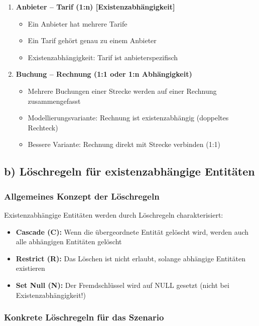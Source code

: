 \documentclass[12pt,a4paper]{article}
\begin{document}
\begin{enumerate}
    \item \textbf{Anbieter -- Tarif (1:n) [Existenzabhängigkeit]}
    \begin{itemize}
        \item Ein Anbieter hat mehrere Tarife
        \item Ein Tarif gehört genau zu einem Anbieter
        \item Existenzabhängigkeit: Tarif ist anbieterspezifisch
    \end{itemize}

    \item \textbf{Buchung -- Rechnung (1:1 oder 1:n Abhängigkeit)}
    \begin{itemize}
        \item Mehrere Buchungen einer Strecke werden auf einer Rechnung zusammengefasst
        \item Modellierungsvariante: Rechnung ist existenzabhängig (doppeltes Rechteck)
        \item Bessere Variante: Rechnung direkt mit Strecke verbinden (1:1)
    \end{itemize}
\end{enumerate}

\subsection*{b) Löschregeln für existenzabhängige Entitäten}

\subsubsection*{Allgemeines Konzept der Löschregeln}

Existenzabhängige Entitäten werden durch Löschregeln charakterisiert:
\begin{itemize}
    \item \textbf{Cascade (C):} Wenn die übergeordnete Entität gelöscht wird, werden auch alle abhängigen Entitäten gelöscht
    \item \textbf{Restrict (R):} Das Löschen ist nicht erlaubt, solange abhängige Entitäten existieren
    \item \textbf{Set Null (N):} Der Fremdschlüssel wird auf NULL gesetzt (nicht bei Existenzabhängigkeit!)
\end{itemize}

\subsubsection*{Konkrete Löschregeln für das Szenario}
\end{document}
